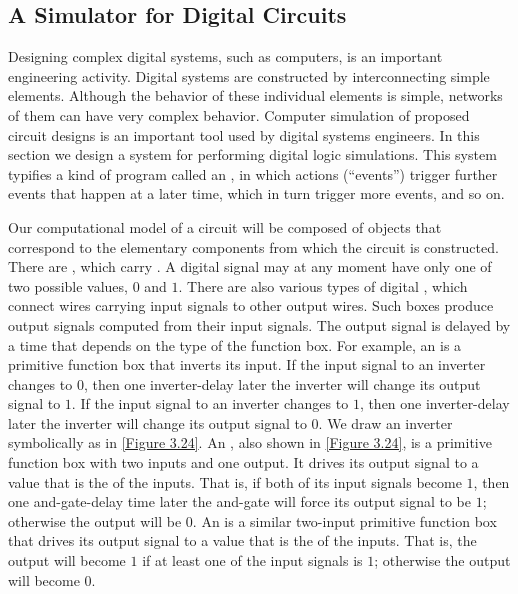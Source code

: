 \subsection{A Simulator for Digital Circuits}
\label{Section 3.3.4}

Designing complex digital systems, such as computers, is an important engineering activity.
Digital systems are constructed by interconnecting simple elements.
Although the behavior of these individual elements is simple, networks of them can have very complex behavior.
Computer simulation of proposed circuit designs is an important tool used by digital systems engineers.
In this section we design a system for performing digital logic simulations.
This system typifies a kind of program called an , in which actions (“events”) trigger further events that happen at a later time, which in turn trigger more events, and so on.

Our computational model of a circuit will be composed of objects that correspond to the elementary components from which the circuit is constructed.
There are , which carry .
A digital signal may at any moment have only one of two possible values, \( 0 \) and \( 1 \).
There are also various types of digital , which connect wires carrying input signals to other output wires.
Such boxes produce output signals computed from their input signals.
The output signal is delayed by a time that depends on the type of the function box.
For example, an  is a primitive function box that inverts its input.
If the input signal to an inverter changes to \( 0 \), then one inverter-delay later the inverter will change its output signal to \( 1 \).
If the input signal to an inverter changes to \( 1 \), then one inverter-delay later the inverter will change its output signal to \( 0 \).
We draw an inverter symbolically as in \cref{Figure 3.24}.
An , also shown in \cref{Figure 3.24}, is a primitive function box with two inputs and one output.
It drives its output signal to a value that is the  of the inputs.
That is, if both of its input signals become \( 1 \), then one and-gate-delay time later the and-gate will force its output signal to be \( 1 \);
otherwise the output will be \( 0 \).
An  is a similar two-input primitive function box that drives its output signal to a value that is the  of the inputs.
That is, the output will become \( 1 \) if at least one of the input signals is \( 1 \);
otherwise the output will become \( 0 \).

